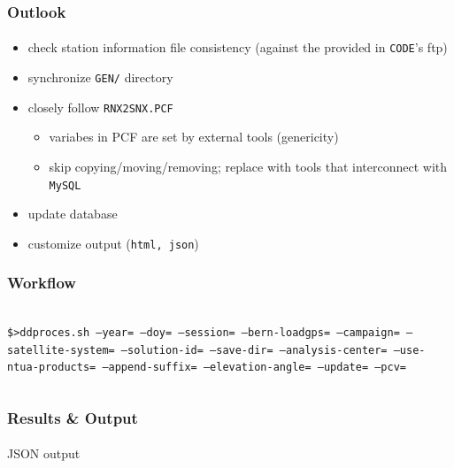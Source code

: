 \documentclass{beamer}
\begin{document}
\begin{frame}\frametitle{Outlook}\framesubtitle{}
  \begin{itemize}
    \item check station information file consistency (against the provided in \texttt{CODE}'s ftp)
    \item synchronize \texttt{GEN/} directory
    \item closely follow \texttt{RNX2SNX.PCF}
    \begin{itemize}
      \item variabes in PCF are set by external tools (genericity)
      \item skip copying/moving/removing; replace with tools that interconnect with \texttt{MySQL}
    \end{itemize}
    \item update database
    \item customize output (\texttt{html, json})
  \end{itemize}
\end{frame}

\begin{frame}\frametitle{Workflow}\framesubtitle{}
\begin{columns}[T] %
\begin{column}{.48\textwidth}
  \texttt{\$>ddproces.sh --year= --doy= --session= --bern-loadgps= --campaign= --satellite-system= --solution-id= --save-dir= --analysis-center= --use-ntua-products= --append-suffix= --elevation-angle= --update= --pcv=}
\end{column}
\hfill%
\begin{column}{.48\textwidth}
\end{column}
\end{columns}
\end{frame}

\begin{frame}\frametitle{Results \& Output}\framesubtitle{}
JSON output
\end{frame}
\end{document}
